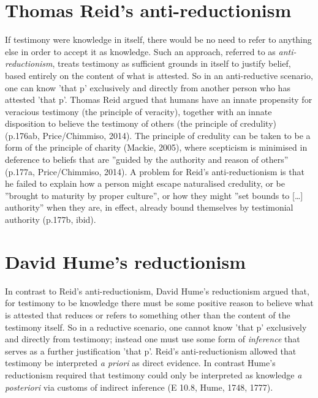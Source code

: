 \documentclass[a4paper, 11pt]{article} %
\begin{document}

\section*{Thomas Reid's anti-reductionism}

If testimony were knowledge in itself, there would be no need to refer to anything else in order to accept it as knowledge. Such an approach, referred to as \textit{anti-reductionism}, treats testimony as sufficient grounds in itself to justify belief, based entirely on the content of what is attested. So in an anti-reductive scenario, one can know 'that p' exclusively and directly from another person who has attested 'that p'. Thomas Reid argued that humans have an innate propensity for veracious testimony (the principle of veracity), together with an innate disposition to believe the testimony of others (the principle of credulity) (p.176ab, Price/Chimmiso, 2014)\cite{Price/Chismisso:2014}. The principle of credulity can be taken to be a form of the principle of charity (Mackie, 2005)\cite{Mackie:2005}, where scepticism is minimised in deference to beliefs that are ''guided by the authority and reason of others'' (p.177a, Price/Chimmiso, 2014)\cite{Price/Chismisso:2014}. A problem for Reid's anti-reductionism is that he failed to explain how a person might escape naturalised credulity, or be ''brought to maturity by proper culture'', or how they might ''set bounds to [\dots] authority'' when they are, in effect, already bound themselves by testimonial authority (p.177b, ibid)\cite{Price/Chismisso:2014}.


\section*{David Hume's reductionism}

In contrast to Reid's anti-reductionism, David Hume's reductionism argued that, for testimony to be knowledge there must be some positive reason to believe what is attested that reduces or refers to something other than the content of the testimony itself. So in a reductive scenario, one cannot know 'that p' exclusively and directly from testimony; instead one must use some form of \textit{inference} that serves as a further justification 'that p'. Reid's anti-reductionism allowed that testimony be interpreted \textit{a priori} as direct evidence. In contrast Hume's reductionism required that testimony could only be interpreted as knowledge \textit{a posteriori} via customs of indirect inference (E 10.8, Hume, 1748, 1777)\cite{Hume:1748}.
\end{document}
